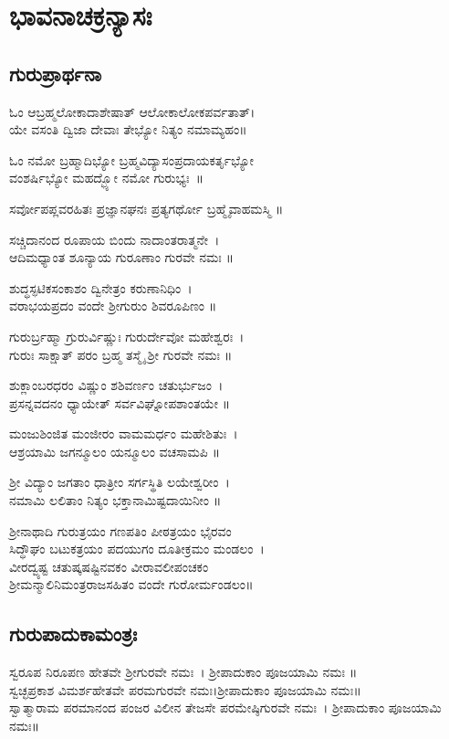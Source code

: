 \chapter*{\center ಭಾವನಾಚಕ್ರನ್ಯಾಸಃ}
\thispagestyle{empty}
\section{ಗುರುಪ್ರಾರ್ಥನಾ}
ಓಂ ಆಬ್ರಹ್ಮಲೋಕಾದಾಶೇಷಾತ್ ಆಲೋಕಾಲೋಕಪರ್ವತಾತ್।\\
ಯೇ ವಸಂತಿ ದ್ವಿಜಾ ದೇವಾಃ ತೇಭ್ಯೋ ನಿತ್ಯಂ ನಮಾಮ್ಯಹಂ॥

ಓಂ ನಮೋ ಬ್ರಹ್ಮಾದಿಭ್ಯೋ ಬ್ರಹ್ಮವಿದ್ಯಾಸಂಪ್ರದಾಯಕರ್ತೃಭ್ಯೋ\\ ವಂಶರ್ಷಿಭ್ಯೋ ಮಹದ್ಭ್ಯೋ ನಮೋ ಗುರುಭ್ಯಃ~॥

ಸರ್ವೋಪಪ್ಲವರಹಿತಃ ಪ್ರಜ್ಞಾನಘನಃ ಪ್ರತ್ಯಗರ್ಥೋ ಬ್ರಹ್ಮೈವಾಹಮಸ್ಮಿ ॥

ಸಚ್ಚಿದಾನಂದ ರೂಪಾಯ ಬಿಂದು ನಾದಾಂತರಾತ್ಮನೇ~।\\
ಆದಿಮಧ್ಯಾಂತ ಶೂನ್ಯಾಯ ಗುರೂಣಾಂ ಗುರವೇ ನಮಃ ॥

ಶುದ್ಧಸ್ಫಟಿಕಸಂಕಾಶಂ ದ್ವಿನೇತ್ರಂ ಕರುಣಾನಿಧಿಂ~।\\
ವರಾಭಯಪ್ರದಂ ವಂದೇ ಶ್ರೀಗುರುಂ ಶಿವರೂಪಿಣಂ ॥

ಗುರುರ್ಬ್ರಹ್ಮಾ ಗ್ರುರುರ್ವಿಷ್ಣುಃ ಗುರುರ್ದೇವೋ ಮಹೇಶ್ವರಃ~।\\
ಗುರುಃ ಸಾಕ್ಷಾತ್ ಪರಂ ಬ್ರಹ್ಮ ತಸ್ಮೈ ಶ್ರೀ ಗುರವೇ ನಮಃ ॥

ಶುಕ್ಲಾಂಬರಧರಂ ವಿಷ್ಣುಂ ಶಶಿವರ್ಣಂ ಚತುರ್ಭುಜಂ~।\\
ಪ್ರಸನ್ನವದನಂ ಧ್ಯಾಯೇತ್ ಸರ್ವವಿಘ್ನೋಪಶಾಂತಯೇ ॥

ಮಂಜುಶಿಂಜಿತ ಮಂಜೀರಂ ವಾಮಮರ್ಧಂ ಮಹೇಶಿತುಃ~।\\
ಆಶ್ರಯಾಮಿ ಜಗನ್ಮೂಲಂ ಯನ್ಮೂಲಂ ವಚಸಾಮಪಿ ॥

ಶ್ರೀ ವಿದ್ಯಾಂ ಜಗತಾಂ ಧಾತ್ರೀಂ ಸರ್ಗಸ್ಥಿತಿ ಲಯೇಶ್ವರೀಂ~।\\
ನಮಾಮಿ ಲಲಿತಾಂ ನಿತ್ಯಂ ಭಕ್ತಾನಾಮಿಷ್ಟದಾಯಿನೀಂ ॥

ಶ್ರೀನಾಥಾದಿ ಗುರುತ್ರಯಂ ಗಣಪತಿಂ ಪೀಠತ್ರಯಂ ಭೈರವಂ\\
ಸಿದ್ಧೌಘಂ ಬಟುಕತ್ರಯಂ ಪದಯುಗಂ ದೂತೀಕ್ರಮಂ ಮಂಡಲಂ~।\\
ವೀರದ್ವ್ಯಷ್ಟ ಚತುಷ್ಕಷಷ್ಟಿನವಕಂ ವೀರಾವಲೀಪಂಚಕಂ\\
ಶ್ರೀಮನ್ಮಾಲಿನಿಮಂತ್ರರಾಜಸಹಿತಂ ವಂದೇ ಗುರೋರ್ಮಂಡಲಂ॥

\section{ಗುರುಪಾದುಕಾಮಂತ್ರಃ}
 ಸ್ವರೂಪ ನಿರೂಪಣ ಹೇತವೇ ಶ್ರೀಗುರವೇ ನಮಃ~। ಶ್ರೀಪಾದುಕಾಂ ಪೂಜಯಾಮಿ ನಮಃ ॥\\
 ಸ್ವಚ್ಛಪ್ರಕಾಶ ವಿಮರ್ಶಹೇತವೇ ಪರಮಗುರವೇ ನಮಃ।ಶ್ರೀಪಾದುಕಾಂ ಪೂಜಯಾಮಿ ನಮಃ॥\\
 ಸ್ವಾತ್ಮಾರಾಮ ಪರಮಾನಂದ ಪಂಜರ ವಿಲೀನ ತೇಜಸೇ ಪರಮೇಷ್ಠಿಗುರವೇ ನಮಃ~। ಶ್ರೀಪಾದುಕಾಂ ಪೂಜಯಾಮಿ ನಮಃ॥

